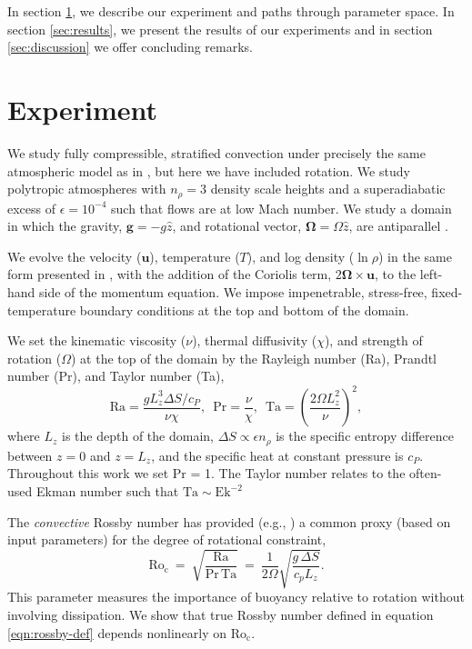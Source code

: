 \documentclass[twocolumn, amsmath, amsfonts, amssymb]{aastex62}
\newcommand{\con}{\ensuremath{\text{Ro}_{\text{c}}}}
\begin{document}
In section  \ref{sec:experiment}, we describe our experiment and paths through parameter space. 
In section \ref{sec:results}, we present the results of our experiments and in section \ref{sec:discussion} we offer concluding remarks.

\section{Experiment} 
\label{sec:experiment}
We study fully compressible, stratified 
convection under precisely the same atmospheric model
as in \AB, but here
we have included rotation. We study polytropic atmospheres
with $n_\rho = 3$ density scale heights and a superadiabatic
excess of $\epsilon = 10^{-4}$ such that flows are at low Mach number.
We study a domain in which the
gravity, $\bm{g} = -g\hat{z}$, and rotational vector, $\bm{\Omega} = \Omega \hat{z}$, 
are antiparallel \citep[as in e.g.,][]{julien&all1996, brummell&all1996}.

We evolve the velocity ($\bm{u}$), temperature ($T$), 
and log density ($\ln\rho$) in the same form presented in \AB, with the
addition of the Coriolis term, $2\bm{\Omega}\times\bm{u}$, to the left-hand side
of the momentum equation. 
We impose impenetrable, stress-free, fixed-temperature boundary conditions at the top and bottom of the domain.


We set the kinematic viscosity ($\nu$), thermal diffusivity ($\chi$), and strength of
rotation ($\Omega$) at the top of the domain by the Rayleigh number 
(Ra), Prandtl number (Pr), and Taylor number (Ta),
\begin{equation}
    \text{Ra} = \frac{g L_z^3 \Delta S / c_P}{\nu \chi}, \,\,\,
    \text{Pr} = \frac{\nu}{\chi}, \,\,\,
    \text{Ta} = \left(\frac{2 \Omega L_z^2}{\nu}\right)^2,
\end{equation}
where $L_z$ is the depth of the domain, 
$\Delta S \propto \epsilon n_\rho$ is the specific entropy difference between
$z = 0$ and $z = L_z$, and the specific heat at constant pressure is $c_P$.
Throughout this work we set Pr = 1. The Taylor number relates to the often-used
Ekman number such that $\text{Ta} \sim \text{Ek}^{-2}$

The \textit{convective} Rossby number has provided (e.g., \cite{julien&all1996, brummell&all1996}) 
a common proxy (based on input parameters) for the degree of rotational constraint,
\begin{equation}
\con \ = \   \sqrt{ \frac{\text{Ra}}{\text{Pr}\, \text{Ta} } } \ 
= \  \frac{1}{2 \Omega } \sqrt{\frac{g \, \Delta  S}{c_{p} L_{z}}}.
\end{equation}
This parameter measures the importance of buoyancy relative to rotation without 
involving dissipation. We show that true Rossby number defined in equation \ref{eqn:rossby-def} 
depends nonlinearly on $\con$.  
\end{document}
